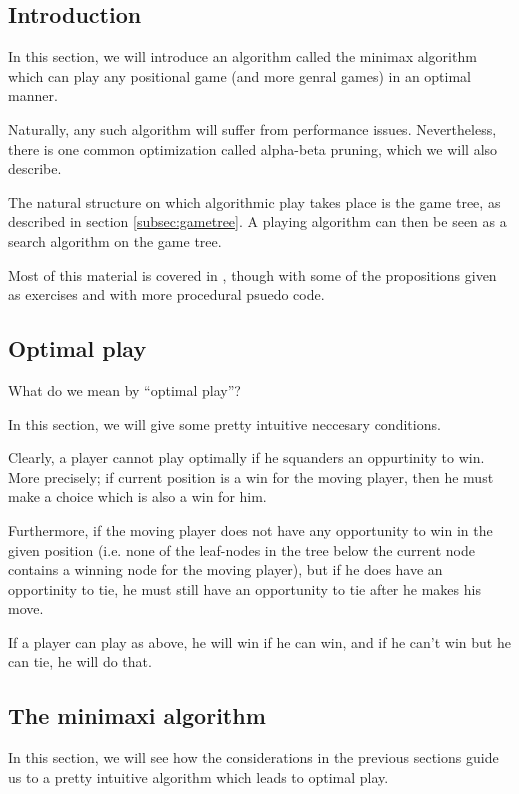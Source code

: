\subsection{Introduction}

In this section, we will introduce an algorithm called the minimax algorithm which can play any positional game (and more genral games) in an optimal manner.

Naturally, any such algorithm will suffer from performance issues.
Nevertheless, there is one common optimization called alpha-beta pruning, which we will also describe.

The natural structure on which algorithmic play takes place is the game tree, as described in section \ref{subsec:gametree}.
A playing algorithm can then be seen as a search algorithm on the game tree.


Most of this material is covered in \citep{aimodernapproach}, though with some of the propositions given as exercises and with more procedural psuedo code.

\subsection{Optimal play}

What do we mean by ``optimal play''?

In this section, we will give some pretty intuitive neccesary conditions.

Clearly, a player cannot play optimally if he squanders an oppurtinity to win.
More precisely; if current position is a win for the moving player, then he must make a choice which is also a win for him.

Furthermore, if the moving player does not have any opportunity to win in the given position (i.e. none of the leaf-nodes in the tree below the current node contains a winning node for the moving player), but if he does have an opportinity to tie, he must still have an opportunity to tie after he makes his move.

If a player can play as above, he will win if he can win, and if he can't win but he can tie, he will do that.

\subsection{The minimaxi algorithm}
\label{sec:minimaxi}

In this section, we will see how the considerations in the previous sections guide us to a pretty intuitive algorithm which leads to optimal play.

